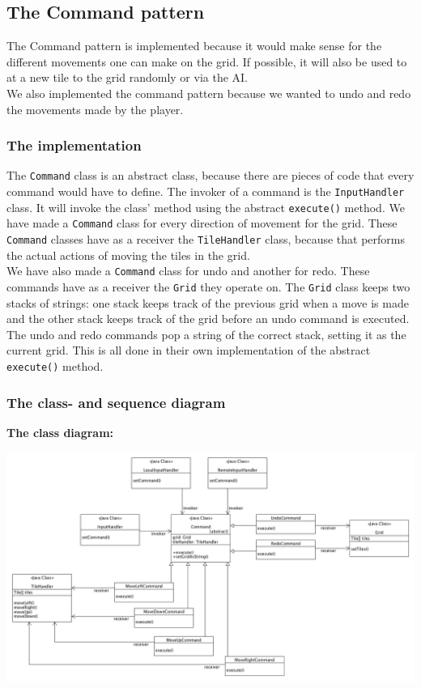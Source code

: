 \documentclass[a4paper,11pt,report]{scrartcl}
\begin{document}
\subsection{The Command pattern}
The Command pattern is implemented because it would make sense for the different
movements one can make on the grid. If possible, it will also be used to at a
new tile to the grid randomly or via the AI.\\

We also implemented the command pattern because we wanted to undo and redo the
movements made by the player.

\subsubsection{The implementation}
The \texttt{Command} class is an abstract class, because there are pieces of
code that every command would have to define. The invoker of a command is the
\texttt{InputHandler} class. It will invoke the class' method using the abstract
\texttt{execute()} method. We have made a \texttt{Command} class for every direction of
movement for the grid. These \texttt{Command} classes have as a receiver the
\texttt{TileHandler} class, because that performs the actual actions
of moving the tiles in the grid.\\

We have also made a \texttt{Command} class for undo and another for redo. These
commands have as a receiver the \texttt{Grid} they operate on. The \texttt{Grid} class
keeps two stacks of strings: one stack keeps track of the previous grid when a
move is made and the other stack keeps track of the grid before an undo
command is executed. The undo and redo commands pop a string of the correct
stack, setting it as the current grid. This is all done in their own implementation
of the abstract \texttt{execute()} method.

\newpage
\subsubsection{The class- and sequence diagram}
\textbf{The class diagram:}\\
\centerline{\includegraphics[scale=0.4]{sources/commandPatternUML}}
\end{document}
